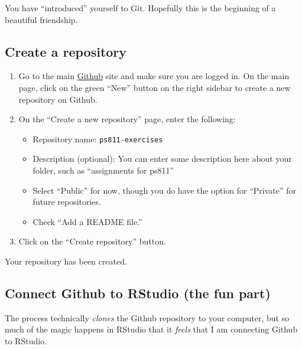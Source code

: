 \documentclass[
]{book}
\providecommand{\tightlist}{%
  \setlength{\itemsep}{0pt}\setlength{\parskip}{0pt}}
\begin{document}
You have ``introduced'' yourself to Git. Hopefully this is the beginning of a beautiful friendship.

\hypertarget{create-a-repository}{%
\subsection{Create a repository}\label{create-a-repository}}

\begin{enumerate}
\def\labelenumi{\arabic{enumi}.}
\setcounter{enumi}{2}
\item
  Go to the main \href{https://github.com}{Github} site and make sure you are logged in. On the main page, click on the green ``New'' button on the right sidebar to create a new repository on Github.
\item
  On the ``Create a new repository'' page, enter the following:

  \begin{itemize}
  \tightlist
  \item
    Repository name: \texttt{ps811-exercises}
  \item
    Description (optional): You can enter some description here about your folder, such as ``assignments for ps811''
  \item
    Select ``Public'' for now, though you do have the option for ``Private'' for future repositories.
  \item
    Check ``Add a README file.''
  \end{itemize}
\item
  Click on the ``Create repository'' button.
\end{enumerate}

Your repository has been created.

\hypertarget{connect-github-to-rstudio-the-fun-part}{%
\subsection{Connect Github to RStudio (the fun part)}\label{connect-github-to-rstudio-the-fun-part}}

The process technically \emph{clones} the Github repository to your computer, but so much of the magic happens in RStudio that it \emph{feels} that I am connecting Github to RStudio.
\end{document}

